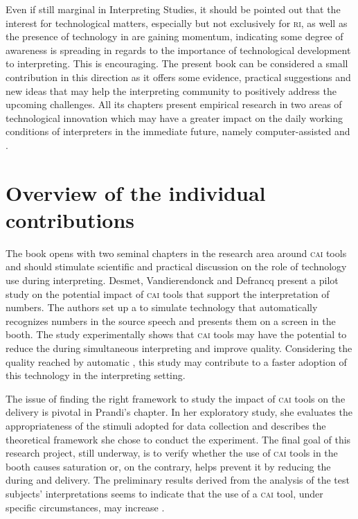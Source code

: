 \documentclass[output=paper]{langsci/langscibook}
\begin{document}
Even if still marginal in Interpreting Studies, it should be pointed out that the interest for technological matters, especially but not exclusively for \textsc{ri}, as well as the presence of technology in  are gaining momentum, indicating some degree of awareness is spreading in regards to the importance of technological development to interpreting. This is encouraging. The present book can be considered a small contribution in this direction as it offers some evidence, practical suggestions and new ideas that may help the interpreting community to positively address the upcoming challenges. All its chapters present empirical research in two areas of technological innovation which may have a greater impact on the daily working conditions of interpreters in the immediate future, namely computer-assisted and . 
 
\section{Overview of the individual contributions}\largerpage[-1]
 
The book opens with two seminal chapters in the research area around \textsc{cai} tools and should stimulate scientific and practical discussion on the role of technology use during interpreting. Desmet, Vandierendonck and Defrancq present a pilot study on the potential impact of \textsc{cai} tools that support the interpretation of numbers. The authors set up a  to simulate technology that automatically recognizes numbers in the source speech and presents them on a screen in the booth. The study experimentally shows that \textsc{cai} tools may have the potential to reduce the  during simultaneous interpreting and improve quality. Considering the quality reached by automatic , this study may contribute to a faster adoption of this technology in the interpreting setting. 

The issue of finding the right framework to study the impact of \textsc{cai} tools on the  delivery is pivotal in Prandi’s chapter. In her exploratory study, she evaluates the appropriateness of the stimuli adopted for data collection and describes the theoretical framework she chose to conduct the experiment. The final goal of this research project, still underway, is to verify whether the use of \textsc{cai} tools in the booth causes saturation or, on the contrary, helps prevent it by reducing the  during  and delivery. The preliminary results derived from the analysis of the test subjects’ interpretations seems to indicate that the use of a \textsc{cai} tool, under specific circumstances, may increase . 
 
\end{document}
